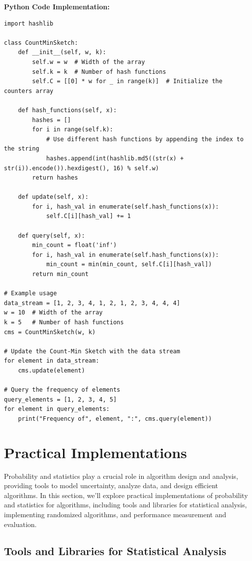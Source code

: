 \documentclass[12pt]{book} %
\begin{document}
\textbf{Python Code Implementation:}
\FloatBarrier
\begin{lstlisting}
import hashlib

class CountMinSketch:
    def __init__(self, w, k):
        self.w = w  # Width of the array
        self.k = k  # Number of hash functions
        self.C = [[0] * w for _ in range(k)]  # Initialize the counters array

    def hash_functions(self, x):
        hashes = []
        for i in range(self.k):
            # Use different hash functions by appending the index to the string
            hashes.append(int(hashlib.md5((str(x) + str(i)).encode()).hexdigest(), 16) % self.w)
        return hashes

    def update(self, x):
        for i, hash_val in enumerate(self.hash_functions(x)):
            self.C[i][hash_val] += 1

    def query(self, x):
        min_count = float('inf')
        for i, hash_val in enumerate(self.hash_functions(x)):
            min_count = min(min_count, self.C[i][hash_val])
        return min_count

# Example usage
data_stream = [1, 2, 3, 4, 1, 2, 1, 2, 3, 4, 4, 4]
w = 10  # Width of the array
k = 5   # Number of hash functions
cms = CountMinSketch(w, k)

# Update the Count-Min Sketch with the data stream
for element in data_stream:
    cms.update(element)

# Query the frequency of elements
query_elements = [1, 2, 3, 4, 5]
for element in query_elements:
    print("Frequency of", element, ":", cms.query(element))
\end{lstlisting}

\section{Practical Implementations}

Probability and statistics play a crucial role in algorithm design and analysis, providing tools to model uncertainty, analyze data, and design efficient algorithms. In this section, we'll explore practical implementations of probability and statistics for algorithms, including tools and libraries for statistical analysis, implementing randomized algorithms, and performance measurement and evaluation.

\subsection{Tools and Libraries for Statistical Analysis}
\end{document}
